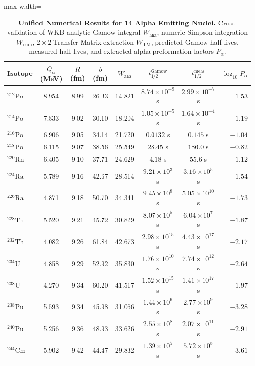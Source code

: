 \documentclass[11pt,a4paper]{article}
\theoremstyle{remark}
\begin{document}
\begin{table}[H]
\centering
\caption{\textbf{Unified Numerical Results for 14 Alpha-Emitting Nuclei.} Cross-validation of WKB analytic Gamow integral $W_{\text{ana}}$, numeric Simpson integration $W_{\text{num}}$, $2\times 2$ Transfer Matrix extraction $W_{\text{TM}}$, predicted Gamow half-lives, measured half-lives, and extracted alpha preformation factors $P_\alpha$.}
\label{tab:nuclei}
\vspace{0.2em}
\scriptsize
\renewcommand{\arraystretch}{0.75}
\setlength{\tabcolsep}{6pt}
\begin{adjustbox}{max width=\linewidth}\begin{tabular}{lccccccr}
\toprule
\textbf{Isotope} & \textbf{$Q_\alpha$ (MeV)} & \textbf{$R$ (fm)} & \textbf{$b$ (fm)} & \textbf{$W_{\text{ana}}$} & \textbf{$t_{1/2}^{\text{Gamow}}$} & \textbf{$t_{1/2}^{\text{meas}}$} & \textbf{$\log_{10} P_\alpha$} \\
\midrule
$^{212}\text{Po}$ & 8.954 & 8.99 & 26.33 & 14.821 & $8.74 \times 10^{-9}$ s & $2.99 \times 10^{-7}$ s & $-1.53$ \\
$^{214}\text{Po}$ & 7.833 & 9.02 & 30.10 & 18.204 & $1.05 \times 10^{-5}$ s & $1.64 \times 10^{-4}$ s & $-1.19$ \\
$^{216}\text{Po}$ & 6.906 & 9.05 & 34.14 & 21.720 & $0.0132$ s & $0.145$ s & $-1.04$ \\
$^{218}\text{Po}$ & 6.115 & 9.07 & 38.56 & 25.549 & $28.45$ s & $186.0$ s & $-0.82$ \\
$^{220}\text{Rn}$ & 6.405 & 9.10 & 37.71 & 24.629 & $4.18$ s & $55.6$ s & $-1.12$ \\
$^{224}\text{Ra}$ & 5.789 & 9.16 & 42.67 & 28.514 & $9.21 \times 10^3$ s & $3.16 \times 10^5$ s & $-1.54$ \\
$^{226}\text{Ra}$ & 4.871 & 9.18 & 50.70 & 34.341 & $9.45 \times 10^8$ s & $5.05 \times 10^{10}$ s & $-1.73$ \\
$^{228}\text{Th}$ & 5.520 & 9.21 & 45.72 & 30.829 & $8.07 \times 10^5$ s & $6.04 \times 10^7$ s & $-1.87$ \\
$^{232}\text{Th}$ & 4.082 & 9.26 & 61.84 & 42.673 & $2.98 \times 10^{15}$ s & $4.43 \times 10^{17}$ s & $-2.17$ \\
$^{234}\text{U}$  & 4.858 & 9.29 & 52.92 & 35.830 & $1.76 \times 10^{10}$ s & $7.74 \times 10^{12}$ s & $-2.64$ \\
$^{238}\text{U}$  & 4.270 & 9.34 & 60.20 & 41.517 & $1.52 \times 10^{15}$ s & $1.41 \times 10^{17}$ s & $-1.97$ \\
$^{238}\text{Pu}$ & 5.593 & 9.34 & 45.98 & 31.066 & $1.44 \times 10^6$ s & $2.77 \times 10^9$ s & $-3.28$ \\
$^{240}\text{Pu}$ & 5.256 & 9.36 & 48.93 & 33.626 & $2.55 \times 10^8$ s & $2.07 \times 10^{11}$ s & $-2.91$ \\
$^{244}\text{Cm}$ & 5.902 & 9.42 & 44.47 & 29.832 & $1.39 \times 10^5$ s & $5.72 \times 10^8$ s & $-3.61$ \\
\bottomrule
\end{tabular}\end{adjustbox}
\end{table}
\end{document}
